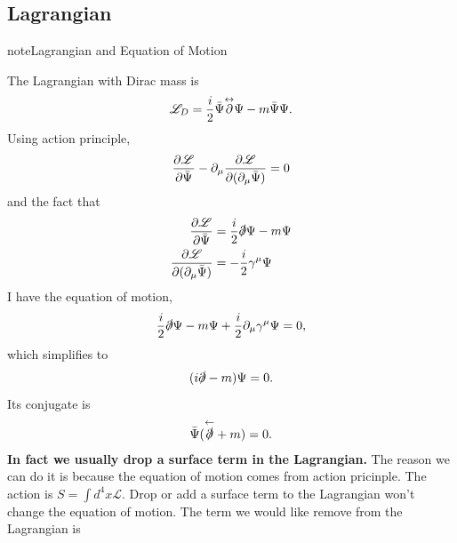\documentclass[letterpaper,12pt,english]{sphinxmanual}
\newcommand{\overlr}[1]{\overset\leftrightarrow{#1}}
\begin{document}
\subsection{Lagrangian}
\label{mass:lagrangian}
\begin{notice}{note}{Lagrangian and Equation of Motion}

The Lagrangian with Dirac mass is
\begin{gather}
\begin{split}\mathscr{L}_D = \frac{i}{2} \bar\Psi \overlr{\partial}\Psi - m \bar\Psi \Psi.\end{split}\notag
\end{gather}
Using action principle,
\begin{gather}
\begin{split}\frac{\partial \mathscr{L}}{\partial \bar\Psi} - \partial_\mu \frac{\partial \mathscr{L}}{\partial( \partial_\mu \bar\Psi)} = 0\end{split}\notag
\end{gather}
and the fact that
\begin{gather}
\begin{split}\frac{\partial \mathscr{L}}{\partial\bar\Psi} &= \frac{i}{2} \slashed{\partial} \Psi - m \Psi \\
\frac{\partial \mathscr{L}}{\partial ( \partial_\mu \bar\Psi)} & = -\frac{i}{2} \gamma^\mu \Psi\end{split}\notag
\end{gather}
I have the equation of motion,
\begin{gather}
\begin{split}\frac{i}{2} \slashed{\partial}\Psi - m\Psi + \frac{i}{2}\partial_\mu \gamma^\mu\Psi = 0,\end{split}\notag
\end{gather}
which simplifies to
\begin{gather}
\begin{split}(i\slashed{\partial} - m) \Psi = 0.\end{split}\notag
\end{gather}
Its conjugate is
\begin{gather}
\begin{split}\bar\Psi (\overset\leftarrow{\slashed{\partial}} + m) = 0.\end{split}\notag
\end{gather}
\textbf{In fact we usually drop a surface term in the Lagrangian.} The reason we can do it is because the equation of motion comes from action pricinple. The action is \(S = \int d^4x \mathscr{L}\). Drop or add a surface term to the Lagrangian won't change the equation of motion. The term we would like remove from the Lagrangian is

\end{notice}
\end{document}
